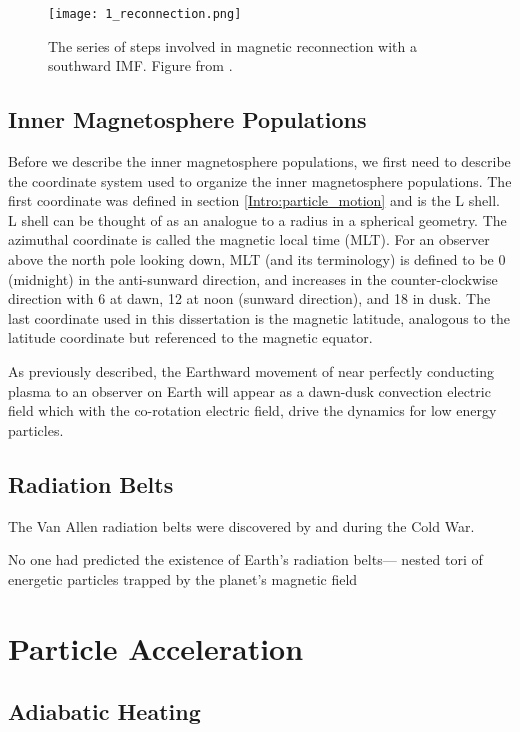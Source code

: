 \begin{figure}
\texttt{[image: 1\_reconnection.png]}
\caption{The series of steps involved in magnetic reconnection with a southward IMF. Figure from \citet{Baumjohann1997}.}
\label{Intro:reconnection}
\end{figure}

\subsection{Inner Magnetosphere Populations}\label{Intro:inner_mag}
Before we describe the inner magnetosphere populations, we first need to describe the coordinate system used to organize the inner magnetosphere populations. The first coordinate was defined in section \ref{Intro:particle_motion} and is the L shell. L shell can be thought of as an analogue to a radius in a spherical geometry. The azimuthal coordinate is called the magnetic local time (MLT). For an observer above the north pole looking down, MLT (and its terminology) is defined to be 0 (midnight) in the anti-sunward direction, and increases in the counter-clockwise direction with 6 at dawn, 12 at noon (sunward direction), and 18 in dusk. The last coordinate used in this dissertation is the magnetic latitude, analogous to the latitude coordinate but referenced to the magnetic equator. 

As previously described, the Earthward movement of near perfectly conducting plasma to an observer on Earth will appear as a dawn-dusk convection electric field which with the co-rotation electric field, drive the dynamics for low energy particles.


\subsection{Radiation Belts}\label{Intro:radiation_belt}
The Van Allen radiation belts were discovered by \citet{Allen1959} and \citet{Vernov1960} during the Cold War.

 No one had predicted the
existence of Earth’s radiation belts—
nested tori of energetic particles trapped
by the planet’s magnetic field

\section{Particle Acceleration}\label{Intro:acceleration}

\subsection{Adiabatic Heating}\label{Intro:adiabatic_heating}


